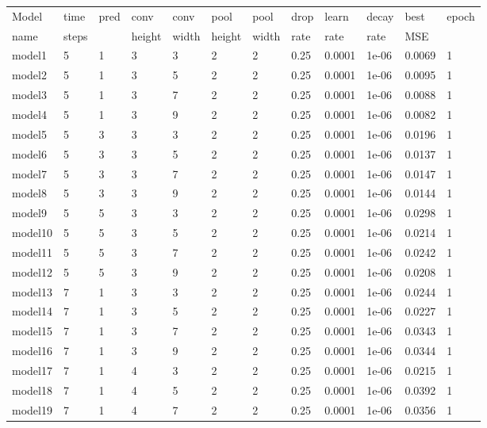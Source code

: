 \documentclass[12pt, twoside]{article}
\begin{document}
\begin{appendices}
	\begin{longtable} {|l|l|l|l|l|l|l|l|l|l|l|l|}		\hline
		Model & time & pred & conv & conv   & pool & pool   & drop & learn & decay & best & epoch \\
		name & steps &     & height & width & height & width & rate & rate & rate & MSE & \\ \hline
		\endhead
		model1 & 5 & 1 & 3 & 3 & 2 & 2 & 0.25 & 0.0001 & 1e-06 & 0.0069 & 1\\ \hline
		model2 & 5 & 1 & 3 & 5 & 2 & 2 & 0.25 & 0.0001 & 1e-06 & 0.0095 & 1\\ \hline
		model3 & 5 & 1 & 3 & 7 & 2 & 2 & 0.25 & 0.0001 & 1e-06 & 0.0088 & 1\\ \hline
		model4 & 5 & 1 & 3 & 9 & 2 & 2 & 0.25 & 0.0001 & 1e-06 & 0.0082 & 1\\ \hline
		model5 & 5 & 3 & 3 & 3 & 2 & 2 & 0.25 & 0.0001 & 1e-06 & 0.0196 & 1\\ \hline
		model6 & 5 & 3 & 3 & 5 & 2 & 2 & 0.25 & 0.0001 & 1e-06 & 0.0137 & 1\\ \hline
		model7 & 5 & 3 & 3 & 7 & 2 & 2 & 0.25 & 0.0001 & 1e-06 & 0.0147 & 1\\ \hline
		model8 & 5 & 3 & 3 & 9 & 2 & 2 & 0.25 & 0.0001 & 1e-06 & 0.0144 & 1\\ \hline
		model9 & 5 & 5 & 3 & 3 & 2 & 2 & 0.25 & 0.0001 & 1e-06 & 0.0298 & 1\\ \hline
		model10 & 5 & 5 & 3 & 5 & 2 & 2 & 0.25 & 0.0001 & 1e-06 & 0.0214 & 1\\ \hline
		model11 & 5 & 5 & 3 & 7 & 2 & 2 & 0.25 & 0.0001 & 1e-06 & 0.0242 & 1\\ \hline
		model12 & 5 & 5 & 3 & 9 & 2 & 2 & 0.25 & 0.0001 & 1e-06 & 0.0208 & 1\\ \hline
		model13 & 7 & 1 & 3 & 3 & 2 & 2 & 0.25 & 0.0001 & 1e-06 & 0.0244 & 1\\ \hline
		model14 & 7 & 1 & 3 & 5 & 2 & 2 & 0.25 & 0.0001 & 1e-06 & 0.0227 & 1\\ \hline
		model15 & 7 & 1 & 3 & 7 & 2 & 2 & 0.25 & 0.0001 & 1e-06 & 0.0343 & 1\\ \hline
		model16 & 7 & 1 & 3 & 9 & 2 & 2 & 0.25 & 0.0001 & 1e-06 & 0.0344 & 1\\ \hline
		model17 & 7 & 1 & 4 & 3 & 2 & 2 & 0.25 & 0.0001 & 1e-06 & 0.0215 & 1\\ \hline
		model18 & 7 & 1 & 4 & 5 & 2 & 2 & 0.25 & 0.0001 & 1e-06 & 0.0392 & 1\\ \hline
		model19 & 7 & 1 & 4 & 7 & 2 & 2 & 0.25 & 0.0001 & 1e-06 & 0.0356 & 1\\ \hline

\end{longtable}
\end{appendices}
\end{document}
